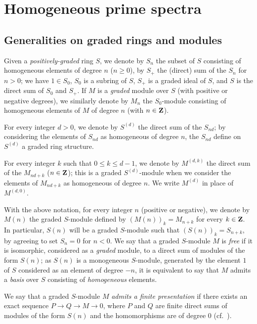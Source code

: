 \section{Homogeneous prime spectra}
\label{section:II.2}

\subsection{Generalities on graded rings and modules}
\label{subsection:II.2.1}

\begin{notation}[2.1.1]
\label{II.2.1.1}
Given a \emph{positively-graded} ring $S$, we denote by $S_n$ the subset of $S$ consisting of homogeneous elements of degree $n$ ($n\geq 0$), by $S_+$ the (direct) sum of the $S_n$ for $n>0$;
we have $1\in S_0$, $S_0$ is a subring of $S$, $S_+$ is a graded ideal of $S$, and $S$ is the direct sum of $S_0$ and $S_+$.
If $M$ is a \emph{graded} module over $S$ (with positive or negative degrees), we similarly denote by $M_n$ the $S_0$-module consisting of homogeneous elements of $M$ of degree $n$ (with $n\in\mathbf{Z}$).

For every integer $d>0$, we denote by $S^{(d)}$ the direct sum of the $S_{nd}$;
by considering the elements of $S_{nd}$ as homogeneous of degree $n$, the $S_{nd}$ define on $S^{(d)}$ a graded ring structure.

For every integer $k$ such that $0\leq k\leq d-1$, we denote by $M^{(d,k)}$ the direct sum
of the $M_{nd+k}$ ($n\in\mathbf{Z}$);
this is a graded $S^{(d)}$-module when we consider the elements of $M_{nd+k}$ as homogeneous of degree $n$.
We write $M^{(d)}$ in place of $M^{(d,0)}$.

With the above notation, for every integer $n$ (positive or negative), we denote by $M(n)$ the graded $S$-module defined by $(M(n))_k=M_{n+k}$ for every $k\in\mathbf{Z}$.
In particular, $S(n)$ will be a graded $S$-module such that $(S(n))_k=S_{n+k}$, by agreeing to set $S_n=0$ for $n<0$.
We say that a graded $S$-module $M$ is \emph{free} if it is isomorphic, considered as a \emph{graded} module, to a direct sum of modules of the form $S(n)$;
as $S(n)$ is a monogeneous $S$-module, generated by the element $1$ of $S$ considered as an element of degree $-n$, it is equivalent to say that $M$ admits a \emph{basis} over $S$ consisting of \emph{homogeneous} elements.

We say that a graded $S$-module $M$ \emph{admits a finite presentation} if there exists an exact sequence $P\to Q\to M\to 0$, where $P$ and $Q$ are finite direct sums of modules of the form $S(n)$ and the homomorphisms are of degree $0$ (cf.~).
\end{notation}

